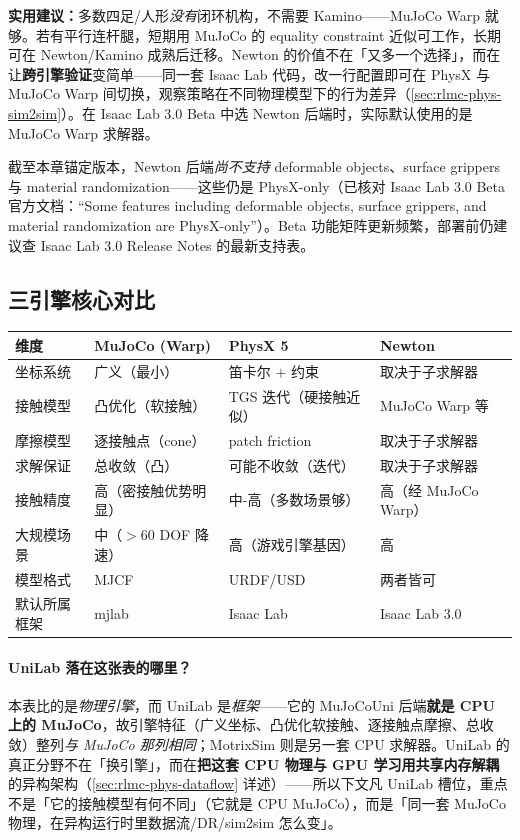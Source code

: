 \textbf{实用建议：}多数四足/人形\emph{没有}闭环机构，不需要 Kamino——MuJoCo Warp 就够。若有平行连杆腿，短期用 MuJoCo 的 equality constraint 近似可工作，长期可在 Newton/Kamino 成熟后迁移。Newton 的价值不在「又多一个选择」，而在让\textbf{跨引擎验证}变简单——同一套 Isaac Lab 代码，改一行配置即可在 PhysX 与 MuJoCo Warp 间切换，观察策略在不同物理模型下的行为差异（\cref{sec:rlmc-phys-sim2sim}）。在 Isaac Lab 3.0 Beta 中选 Newton 后端时，实际默认使用的是 MuJoCo Warp 求解器。

\begin{note}
截至本章锚定版本，Newton 后端\emph{尚不支持} deformable objects、surface grippers 与 material randomization——这些仍是 PhysX-only（已核对 Isaac Lab 3.0 Beta 官方文档：``Some features including deformable objects, surface grippers, and material randomization are PhysX-only''）。Beta 功能矩阵更新频繁，部署前仍建议查 Isaac Lab 3.0 Release Notes 的最新支持表。
\end{note}

\subsection{三引擎核心对比}
\label{sec:rlmc-phys-compare}

\begin{center}
\small
\begin{tabular}{@{}lp{3.2cm}p{3.2cm}p{3.0cm}@{}}
\toprule
维度 & MuJoCo (Warp) & PhysX 5 & Newton \\
\midrule
坐标系统 & 广义（最小） & 笛卡尔 $+$ 约束 & 取决于子求解器 \\
接触模型 & 凸优化（软接触） & TGS 迭代（硬接触近似） & MuJoCo Warp 等 \\
摩擦模型 & 逐接触点（cone） & patch friction & 取决于子求解器 \\
求解保证 & 总收敛（凸） & 可能不收敛（迭代） & 取决于子求解器 \\
接触精度 & 高（密接触优势明显） & 中-高（多数场景够） & 高（经 MuJoCo Warp） \\
大规模场景 & 中（$>60$ DOF 降速） & 高（游戏引擎基因） & 高 \\
模型格式 & MJCF & URDF/USD & 两者皆可 \\
默认所属框架 & mjlab & Isaac Lab & Isaac Lab 3.0 \\
\bottomrule
\end{tabular}
\end{center}

\paragraph{UniLab 落在这张表的哪里？}本表比的是\emph{物理引擎}，而 UniLab 是\emph{框架}——它的 MuJoCoUni 后端\textbf{就是 CPU 上的 MuJoCo}，故引擎特征（广义坐标、凸优化软接触、逐接触点摩擦、总收敛）整列\emph{与 MuJoCo 那列相同}；MotrixSim 则是另一套 CPU 求解器。UniLab 的真正分野不在「换引擎」，而在\textbf{把这套 CPU 物理与 GPU 学习用共享内存解耦}的异构架构（\cref{sec:rlmc-phys-dataflow} 详述）——所以下文凡 UniLab 槽位，重点不是「它的接触模型有何不同」（它就是 CPU MuJoCo），而是「同一套 MuJoCo 物理，在异构运行时里数据流/DR/sim2sim 怎么变」。

